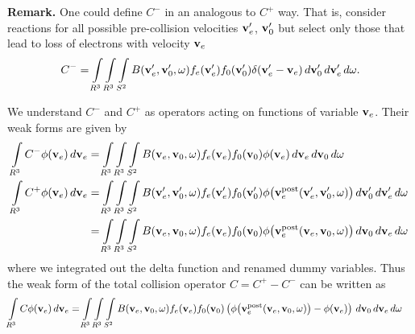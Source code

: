\documentclass{article}
\begin{document}
\textbf{Remark.} One could define $C^-$ in an analogous to $C^+$ way. That is, consider reactions for all possible pre-collision velocities $\mathbf{v}_e^\prime$, $\mathbf{v}_0^\prime$ but select only those that lead to loss of electrons with velocity $\mathbf{v}_e$
\begin{align*}
C^- = \myint_{R^3} \myint_{R^3} \myint_{S^2} 
B\of{\vect{v}_e^\prime, \vect{v}_0^\prime, \vect{\omega}} 
f_e\of{\vect{v}_e^\prime} f_0\of{\vect{v}_0^\prime} 
\delta\of{\vect{v}_e^\prime - \vect{v}_e} 
\diff{\vect{v}_0^\prime} \diff{\vect{v}_e^\prime} \diff{\vect{\omega}}.
\end{align*}

We understand $C^-$ and $C^+$ as operators acting on functions of variable $\mathbf{v}_e$. Their weak forms are given by
\begin{align*}
\myint_{R^3} C^- \phi\of{\vect{v}_e} \diff{\vect{v}_e} 
&=
\myint_{R^3} \myint_{R^3} \myint_{S^2} 
B\of{\vect{v}_e, \vect{v}_0, \vect{\omega}} 
f_e\of{\vect{v}_e} f_0\of{\vect{v}_0} 
\phi\of{\vect{v}_e} 
\diff{\vect{v}_e} \diff{\vect{v}_0} \diff{\vect{\omega}}
\\
\myint_{R^3} C^+ \phi\of{\vect{v}_e} \diff{\vect{v}_e} 
&= 
\myint_{R^3} \myint_{R^3} \myint_{S^2} 
B\of{\vect{v}_e^\prime, \vect{v}_0^\prime, \vect{\omega}} 
f_e\of{\vect{v}_e^\prime} f_0\of{\vect{v}_0^\prime} 
\phi\of{\vect{v}_e^\text{post}\of{\vect{v}_e^\prime, \vect{v}_0^\prime, \vect{\omega}}} 
\diff{\vect{v}_0^\prime} \diff{\vect{v}_e^\prime} \diff{\vect{\omega}}
\\
&= 
\myint_{R^3} \myint_{R^3} \myint_{S^2} 
B\of{\vect{v}_e, \vect{v}_0, \vect{\omega}} 
f_e\of{\vect{v}_e} f_0\of{\vect{v}_0} 
\phi\of{\vect{v}_e^\text{post}\of{\vect{v}_e, \vect{v}_0, \vect{\omega}}} 
\diff{\vect{v}_0} \diff{\vect{v}_e} \diff{\vect{\omega}}
\end{align*}
where we integrated out the delta function and renamed dummy variables. Thus the weak form of the total collision operator $C = C^+ - C^-$ can be written as 
\begin{align*}
\myint_{R^3} C \phi\of{\vect{v}_e} \diff{\vect{v}_e} 
&=
\myint_{R^3} \myint_{R^3} \myint_{S^2} 
B\of{\vect{v}_e, \vect{v}_0, \vect{\omega}} 
f_e\of{\vect{v}_e} f_0\of{\vect{v}_0} 
\left(
\phi\of{\vect{v}_e^\text{post}\of{\vect{v}_e, \vect{v}_0, \vect{\omega}}} 
- \phi\of{\vect{v}_e} 
\right)
\diff{\vect{v}_0} \diff{\vect{v}_e} \diff{\vect{\omega}}
\end{align*}
\end{document}
